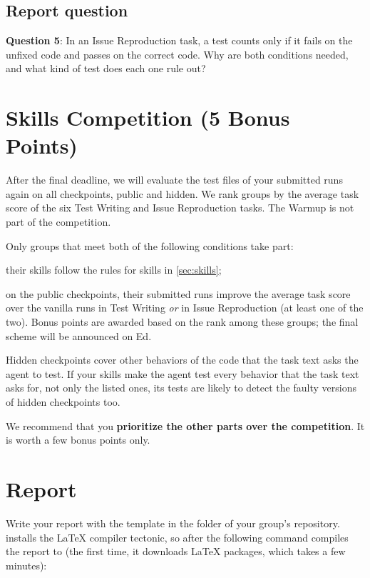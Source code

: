 \documentclass[letterpaper,11pt]{article}
\begin{document}
\subsection{Report question}

\textbf{Question 5}: In an Issue Reproduction task, a test counts only if it
fails on the unfixed code and passes on the correct code. Why are both
conditions needed, and what kind of test does each one rule out?

\section{Skills Competition (5 Bonus Points)}
\label{sec:competition}

After the final deadline, we will evaluate the
test files of your submitted runs again on all checkpoints, public and
hidden. We rank groups by the average task score of the six Test Writing and
Issue Reproduction tasks. The Warmup is not part of the competition.

Only groups that meet both of the following conditions take part:
\squishlist
 \item their skills follow the rules for skills in \autoref{sec:skills};
 \item on the public checkpoints, their submitted runs improve the average
   task score over the vanilla runs in Test Writing \emph{or} in Issue
   Reproduction (at least one of the two).
\squishend
Bonus points are awarded based on the rank among these groups; the
final scheme will be announced on Ed.

Hidden checkpoints cover other behaviors of the code that the task text asks
the agent to test. If your skills make the agent test every behavior that the
task text asks for, not only the listed ones, its tests are likely to detect
the faulty versions of hidden checkpoints too.

We recommend that you \textbf{prioritize the other parts over the
competition}. It is worth a few bonus points only.

\section{Report}
\label{sec:report}

Write your report with the template in the folder  of your
group's repository.  installs the LaTeX compiler tectonic, so after
 the following command compiles the report to
 (the first time, it downloads LaTeX packages, which takes
a few minutes):
\end{document}
